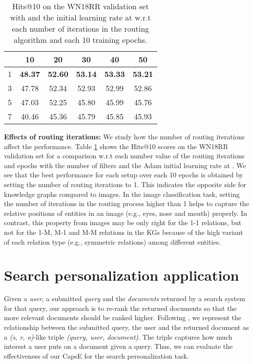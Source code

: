 \documentclass[11pt,a4paper]{article}
\begin{document}
\begin{table}[!t]
\centering
\begin{tabular}{c|ccccc}
\hline
 & 10 & 20 & 30 & 40 & 50\\
\hline
1 & \textbf{48.37} & \textbf{52.60} & \textbf{53.14} & \textbf{53.33} & \textbf{53.21}\\
3 & 47.78 & 52.34 & 52.93 & 52.99 & 52.86\\
5 & 47.03 & 52.25 & 45.80 & 45.99 & 45.76\\
7 & 40.46 & 45.36 & 45.79 & 45.85 & 45.93\\
\hline
\end{tabular}
\caption{Hits@10 on the WN18RR validation set with  and the initial learning rate at  w.r.t each number of iterations in the routing algorithm  and each 10 training epochs.} 
\label{tab:effectofrouting}
\end{table}

\textbf{Effects of routing iterations:} We study how the number of routing iterations affect the performance.
Table \ref{tab:effectofrouting} shows the Hits@10 scores on the WN18RR validation set for a comparison w.r.t each number value of the routing iterations and epochs with the number of filters  and the Adam initial learning rate at .
We see that the best performance for each setup over each 10 epochs is obtained by setting the number  of routing iterations to 1. 
This indicates the opposite side for knowledge graphs compared to images. 
In the image classification task, setting the number  of iterations in the routing process higher than 1 helps to capture the relative positions of entities in an image (e.g., eyes, nose and mouth) properly.
In contrast, this property from images may be only right for the 1-1 relations, but not for the 1-M, M-1 and M-M relations in the KGs because of the high variant of each relation type (e.g., symmetric relations) among different entities.



\section{Search personalization application}
\label{subsec:sp}

Given a \textit{user}, a submitted \textit{query} and the \textit{documents} returned by a search system for that query, our approach is to re-rank the returned documents so that the more relevant documents should be ranked higher.  
Following \citet{vu2017search}, we represent the relationship between the submitted query, the user and the returned document as a \textit{(s, r, o)}-like triple \textit{(query, user, document)}. The triple captures how much interest a user puts on a document given a query. 
Thus, we can evaluate the effectiveness of our CapsE for the search personalization task.
\end{document}
